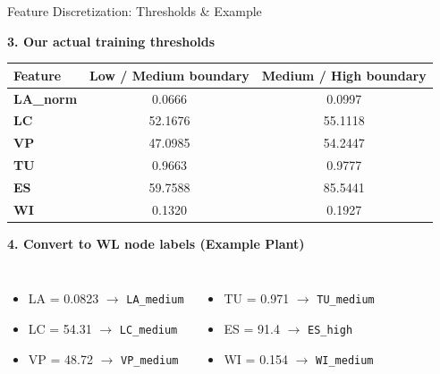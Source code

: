 \documentclass[aspectratio=169, 11pt]{beamer}
\begin{document}
\begin{frame}{Feature Discretization: Thresholds \& Example}
    
    \textbf{3. Our actual training thresholds}
    \begin{table}
        \centering
        \scriptsize
        \begin{tabular}{@{}lcc@{}}
            \toprule
            \textbf{Feature} & \textbf{Low / Medium boundary} & \textbf{Medium / High boundary} \\
            \midrule
            \textbf{LA\_norm} & 0.0666 & 0.0997 \\
            \textbf{LC}       & 52.1676 & 55.1118 \\
            \textbf{VP}       & 47.0985 & 54.2447 \\
            \textbf{TU}       & 0.9663 & 0.9777 \\
            \textbf{ES}       & 59.7588 & 85.5441 \\
            \textbf{WI}       & 0.1320 & 0.1927 \\
            \bottomrule
        \end{tabular}
    \end{table}

    \vspace{0.3cm}
    \textbf{4. Convert to WL node labels (Example Plant)}
    \begin{columns}
        \begin{itemize}\scriptsize
            \item LA = 0.0823 $\rightarrow$ \texttt{LA\_medium}
            \item LC = 54.31 $\rightarrow$ \texttt{LC\_medium}
            \item VP = 48.72 $\rightarrow$ \texttt{VP\_medium}
        \end{itemize}
        
        \begin{itemize}\scriptsize
            \item TU = 0.971 $\rightarrow$ \texttt{TU\_medium}
            \item ES = 91.4 $\rightarrow$ \texttt{ES\_high}
            \item WI = 0.154 $\rightarrow$ \texttt{WI\_medium}
        \end{itemize}
    \end{columns}
\end{frame}
\end{document}
